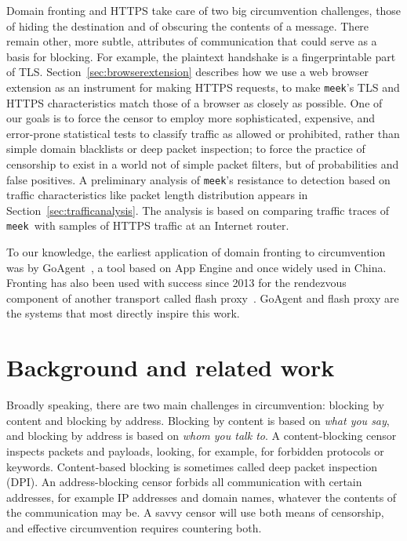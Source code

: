 \documentclass[conference]{IEEEtran}
\newcommand{\meek}{\texttt{meek}\xspace}
\begin{document}
Domain fronting and HTTPS take care of two big circumvention challenges,
those of hiding the destination and of obscuring the contents of a message.
There remain other, more subtle, attributes of communication
that could serve as a basis for blocking.
For example, the plaintext handshake is a fingerprintable part of TLS.
Section~\ref{sec:browserextension} describes how we use a web browser extension as an instrument for making HTTPS requests,
to make \meek's TLS and HTTPS characteristics
match those of a browser as closely as possible.
One of our goals is to force the censor
to employ more sophisticated, expensive, and error-prone statistical tests
to classify traffic as allowed or prohibited,
rather than simple domain blacklists or deep packet inspection;
to force the practice of censorship to exist in a world
not of simple packet filters,
but of probabilities and false positives.
A preliminary analysis of \meek's resistance to detection
based on traffic characteristics like packet length distribution
appears in Section~\ref{sec:trafficanalysis}.
The analysis is based on comparing traffic traces of \meek\
with samples of HTTPS traffic at an Internet router.

To our knowledge,
the earliest application of domain fronting to circumvention
was by GoAgent~\cite{goagent},
a tool based on App Engine and
once widely used in China.
Fronting has also been used with success since 2013
for the rendezvous component of another transport called flash proxy~\cite{flashproxy}.
GoAgent and flash proxy are the systems that most directly
inspire this work.


\section{Background and related work}
\label{sec:related-work}

Broadly speaking, there are two main challenges in circumvention:
blocking by content and blocking by address.
Blocking by content is based on \emph{what you say},
and blocking by address is based on \emph{whom you talk to}.
A content-blocking censor inspects packets and payloads,
looking, for example, for forbidden protocols or keywords.
Content-based blocking is sometimes called deep packet inspection (DPI).
An address-blocking censor forbids all communication with certain
addresses, for example IP addresses and domain names, whatever the contents of the communication may be.
A savvy censor will use both means of censorship, and
effective circumvention requires countering both.
\end{document}
